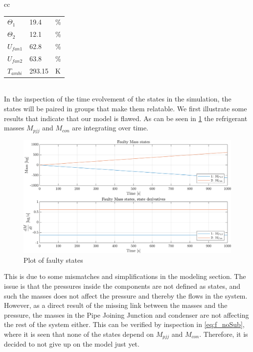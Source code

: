\begin{tabular}{cc}
\begin{minipage}{.3\linewidth}
\begin{tabular}{@{}lll@{}}
			$\Theta_1$      & 19.4                                                               & \%            \\
			$\Theta_2$      & 12.1                                                               & \%            \\
			$U_{fan1}$      & 62.8                                                               & \%            \\
			$U_{fan2}$      & 63.8                                                               & \%            \\
			$T_{ambi}$        & 293.15                                                             & K             \\ \bottomrule
		\end{tabular}
	\end{minipage}
\end{tabular}\\


In the inspection of the time evolvement of the states in the simulation, the states will be paired in groups that make them relatable. We first illustrate some results that indicate that our model is flawed. As can be seen in \cref{fig:non_lin_sim_faulty_Mass} the refrigerant masses $M_{pjj}$ and $M_{con}$ are integrating over time.

\begin{figure}[h]
	\centering
	\includegraphics[width=1\textwidth]{Graphics/nonlin_sim_faulty_Mass.png}
	\caption{Plot of faulty states}
	\label{fig:non_lin_sim_faulty_Mass}
\end{figure}
This is due to some mismatches and simplifications in the modeling section. The issue is that the pressures inside the components are not defined as states, and such the masses does not affect the pressure and thereby the flows in the system. However, as a direct result of the missing link between the masses and the pressure, the masses in the Pipe Joining Junction and condenser are not affecting the rest of the system either. This can be verified by inspection in \cref{eq:f_noSub}, where it is seen that none of the states depend on $M_{pjj}$ and $M_{con}$. Therefore, it is decided to not give up on the model just yet. \\

